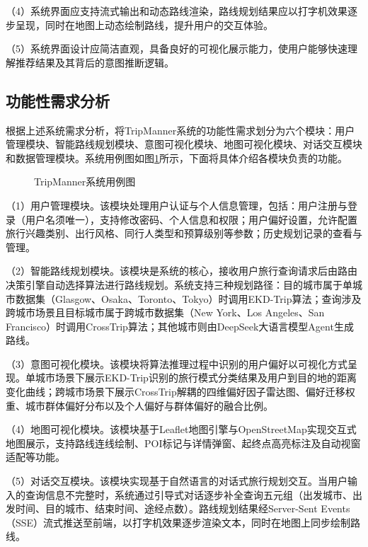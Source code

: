 （4）系统界面应支持流式输出和动态路线渲染，路线规划结果应以打字机效果逐步呈现，同时在地图上动态绘制路线，提升用户的交互体验。

（5）系统界面设计应简洁直观，具备良好的可视化展示能力，使用户能够快速理解推荐结果及其背后的意图推断逻辑。


\subsection{功能性需求分析}
\label{sec:ch5_func_req}

根据上述系统需求分析，将TripManner系统的功能性需求划分为六个模块：用户管理模块、智能路线规划模块、意图可视化模块、地图可视化模块、对话交互模块和数据管理模块。系统用例图如图\ref{fig:ch5_usecase}所示，下面将具体介绍各模块负责的功能。

\begin{figure}[hbt]
  \centering
  \caption{TripManner系统用例图}
  \label{fig:ch5_usecase}
\end{figure}

（1）用户管理模块。该模块处理用户认证与个人信息管理，包括：用户注册与登录（用户名须唯一），支持修改密码、个人信息和权限；用户偏好设置，允许配置旅行兴趣类别、出行风格、同行人类型和预算级别等参数；历史规划记录的查看与管理。

（2）智能路线规划模块。该模块是系统的核心，接收用户旅行查询请求后由路由决策引擎自动选择算法进行路线规划。系统支持三种规划路径：目的城市属于单城市数据集（Glasgow、Osaka、Toronto、Tokyo）时调用EKD-Trip算法；查询涉及跨城市场景且目标城市属于跨城市数据集（New York、Los Angeles、San Francisco）时调用CrossTrip算法；其他城市则由DeepSeek大语言模型Agent生成路线。

（3）意图可视化模块。该模块将算法推理过程中识别的用户偏好以可视化方式呈现。单城市场景下展示EKD-Trip识别的旅行模式分类结果及用户到目的地的距离变化曲线；跨城市场景下展示CrossTrip解耦的四维偏好因子雷达图、偏好迁移权重、城市群体偏好分布以及个人偏好与群体偏好的融合比例。

（4）地图可视化模块。该模块基于Leaflet地图引擎与OpenStreetMap实现交互式地图展示，支持路线连线绘制、POI标记与详情弹窗、起终点高亮标注及自动视窗适配等功能。

（5）对话交互模块。该模块实现基于自然语言的对话式旅行规划交互。当用户输入的查询信息不完整时，系统通过引导式对话逐步补全查询五元组（出发城市、出发时间、目的城市、结束时间、途经点数）。路线规划结果经Server-Sent Events（SSE）流式推送至前端，以打字机效果逐步渲染文本，同时在地图上同步绘制路线。

